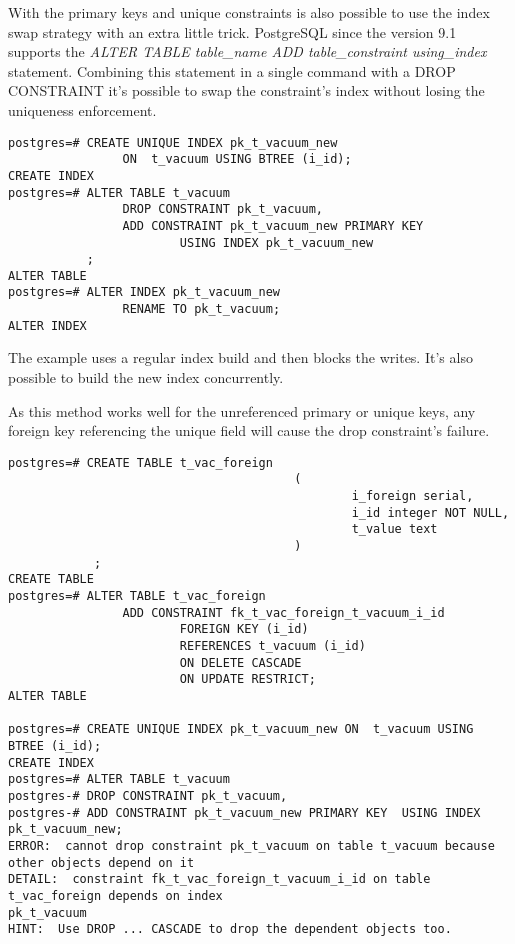 With the primary keys and unique constraints is also possible to use the index swap strategy with 
an extra little trick. PostgreSQL since the version 9.1 supports the \textit{ALTER TABLE table\_name 
ADD table\_constraint using\_index} statement. Combining this statement in a single command with a 
DROP CONSTRAINT it's possible to swap the constraint's index without losing the uniqueness 
enforcement.

\begin{lstlisting}[style=pgsql]
postgres=# CREATE UNIQUE INDEX pk_t_vacuum_new 
                ON  t_vacuum USING BTREE (i_id);
CREATE INDEX
postgres=# ALTER TABLE t_vacuum
                DROP CONSTRAINT pk_t_vacuum,
                ADD CONSTRAINT pk_t_vacuum_new PRIMARY KEY  
                        USING INDEX pk_t_vacuum_new
           ;
ALTER TABLE
postgres=# ALTER INDEX pk_t_vacuum_new 
                RENAME TO pk_t_vacuum;
ALTER INDEX

\end{lstlisting}

The example uses a regular index build and then blocks the writes. It's also possible to 
build the new index concurrently.

As this method works well for the unreferenced primary or unique keys, any foreign key 
referencing the unique field will cause the drop constraint's failure.

\begin{lstlisting}[style=pgsql]
 postgres=# CREATE TABLE t_vac_foreign
                                        (
                                                i_foreign serial,
                                                i_id integer NOT NULL,
                                                t_value text
                                        )
            ;
CREATE TABLE
postgres=# ALTER TABLE t_vac_foreign 
                ADD CONSTRAINT fk_t_vac_foreign_t_vacuum_i_id
                        FOREIGN KEY (i_id) 
                        REFERENCES t_vacuum (i_id) 
                        ON DELETE CASCADE 
                        ON UPDATE RESTRICT;
ALTER TABLE

postgres=# CREATE UNIQUE INDEX pk_t_vacuum_new ON  t_vacuum USING BTREE (i_id);
CREATE INDEX
postgres=# ALTER TABLE t_vacuum
postgres-# DROP CONSTRAINT pk_t_vacuum,
postgres-# ADD CONSTRAINT pk_t_vacuum_new PRIMARY KEY  USING INDEX pk_t_vacuum_new;
ERROR:  cannot drop constraint pk_t_vacuum on table t_vacuum because other objects depend on it
DETAIL:  constraint fk_t_vac_foreign_t_vacuum_i_id on table t_vac_foreign depends on index 
pk_t_vacuum
HINT:  Use DROP ... CASCADE to drop the dependent objects too.


\end{lstlisting}

